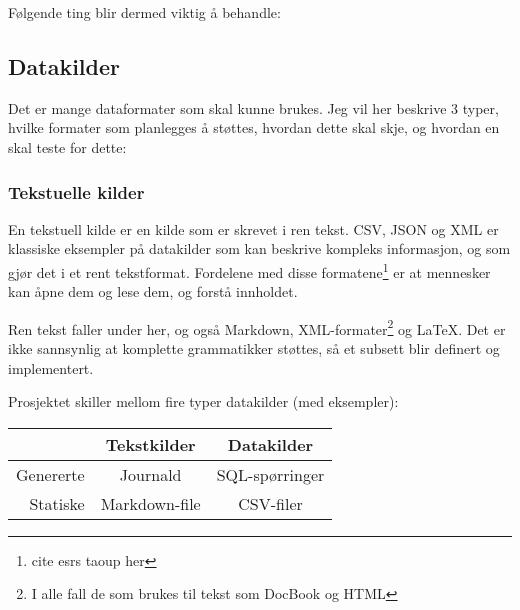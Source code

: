 

Følgende ting blir dermed viktig å behandle:
\subsection{Datakilder}
\label{subsec:evaluering-datakilder}
Det er mange dataformater som skal kunne brukes.
Jeg vil her beskrive 3 typer, hvilke formater som planlegges å støttes, hvordan dette skal skje, og hvordan en skal teste for dette:

\subsubsection{Tekstuelle kilder}
\label{subsec:evaluering-tekst}
En tekstuell kilde er en kilde som er skrevet i ren tekst. CSV, JSON og XML er klassiske eksempler på datakilder som kan beskrive kompleks informasjon, og som gjør det i et rent tekstformat.
Fordelene med disse formatene\footnote{cite esrs taoup her} er at mennesker kan åpne dem og lese dem, og forstå innholdet.

Ren tekst faller under her, og også Markdown, XML-formater\footnote{I alle fall de som brukes til tekst som DocBook og HTML} og \LaTeX.
Det er ikke sannsynlig at komplette grammatikker støttes, så et subsett blir definert og implementert.

Prosjektet skiller mellom fire typer datakilder (med eksempler): \\

\begin{tabular}{ r | c | c}
            & Tekstkilder & Datakilder \\
  \hline
  Genererte & Journald      & SQL-spørringer \\
  Statiske  & Markdown-file & CSV-filer \\
\end{tabular}

